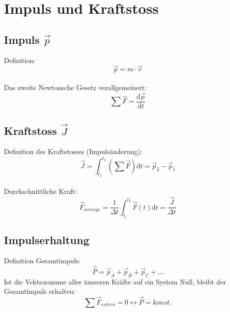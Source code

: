 



\chapter{Impuls und Kraftstoss}
\section{Impuls $\vec{p}$}
Definition:
\[
	\boxed{
		\vec{p}=m\cdot\vec{v}
	}
\]\\
Das zweite Newtonsche Gesetz verallgemeinert:
\[
	\boxed{
		\sum{\vec{F}}=\frac{\mathrm{d}\vec{p}}{\mathrm{d}t}
	}
\]

\section{Kraftstoss $\vec{J}$}
Definition des Kraftstosses (Impuls\"anderung):
\[
	\boxed{
		\vec{J}=\int_{t_1}^{t_2}{(\sum{\vec{F}})\mathrm{d}t}=\vec{p}_2-\vec{p}_1
	}
\]\\
Durchschnittliche Kraft:
\[
	\boxed{
		\vec{F}_{average}=\frac{1}{\Delta t}\int_{t_1}^{t_2}{\vec{F}(t)\mathrm{d}t}=\frac{\vec{J}}{\Delta t}
	}
\]

\section{Impulserhaltung}
Definition Gesamtimpuls:
\[
	\boxed{
		\vec{P}=\vec{p}_A+\vec{p}_B+\vec{p}_C+\ldots
	}
\]
Ist die Vektrosumme aller \"ausseren Kr\"afte auf ein System Null, bleibt der Gesamtimpuls erhalten:
\[
	\boxed{
		\sum{\vec{F}_{extern}}=0\leftrightarrow\vec{P}=konst.
	}
\]
